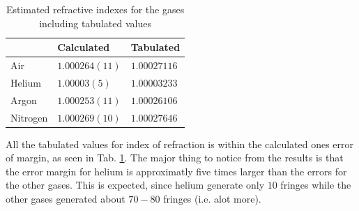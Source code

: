 \begin{table}[H]
  \centering
  \caption{Estimated refractive indexes for the gases including tabulated values}
  \label{tab:refrIndex}
  \begin{tabular}{l|l|l}%
          & Calculated & Tabulated  \\ \hline %
    Air      & $1.000264(11)$%
      & $1.00027116$ \cite{idxAir} \\ %
    Helium   & $1.00003(5)$%
      & $1.00003233$ \cite{idxHeli} \\ %
    Argon    & $1.000253(11)$%
      & $1.00026106$ \cite{idxArg} \\ %
    Nitrogen & $1.000269(10)$%
      & $1.00027646$ \cite{idxNit} \\ %
  \end{tabular}
\end{table}

All the tabulated values for index of refraction is within the calculated ones error of margin, as seen in Tab. \ref{tab:refrIndex}. The major thing to notice from the results is that the error margin for helium is approximatly five times larger than the errors for the other gases. This is expected, since helium generate only $10$ fringes while the other gases generated about $70-80$ fringes (i.e. alot more).
